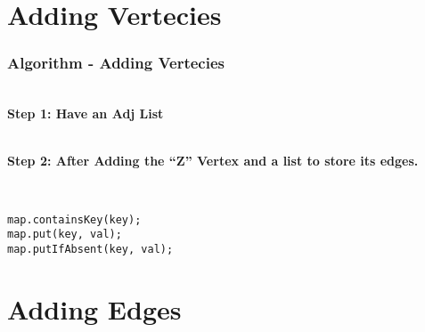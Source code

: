 \documentclass{beamer}
\begin{document}
\section{Adding Vertecies}

\begin{frame}[fragile]
    \frametitle{Algorithm - Adding Vertecies}
    \begin{minipage}{0.49\textwidth}
        \centering
        \resizebox{0.7\textwidth}{!}{
            
        }
        \vspace{.5cm}\\
        \tiny
        \textbf{Step 1: Have an Adj List}
    \end{minipage}
    \begin{minipage}{0.49\textwidth}
        \centering
        \resizebox{0.7\textwidth}{!}{
            
        }
        \vspace{.5cm}\\
        \tiny
        \textbf{Step 2: After Adding the ``Z'' Vertex and a list to store its edges.}
    \end{minipage}
    \vfill\\
    \hspace{4cm}
    \begin{minipage}{0.35\textwidth}
    \begin{lstlisting}[basicstyle=\tiny, frame=trBL]
map.containsKey(key);
map.put(key, val);
map.putIfAbsent(key, val);
    \end{lstlisting}
    \end{minipage}
\end{frame}

\section{Adding Edges}
\end{document}

